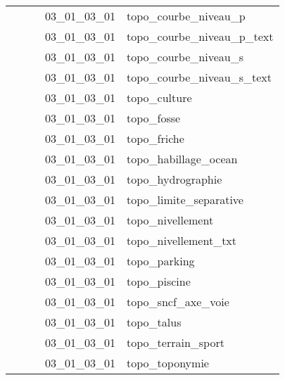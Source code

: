 \documentclass[12pt,titlepage,oneside]{book}
\begin{document}
\begin{supertabular}{|p{7.5cm}|p{7.5cm}|p{7.5cm}|c|p{10cm}|}
                   &                    &                    & 03\_01\_03\_01 & topo\_courbe\_niveau\_p\\
                   &                    &                    & 03\_01\_03\_01 & topo\_courbe\_niveau\_p\_text\\
                   &                    &                    & 03\_01\_03\_01 & topo\_courbe\_niveau\_s\\
                   &                    &                    & 03\_01\_03\_01 & topo\_courbe\_niveau\_s\_text\\
                   &                    &                    & 03\_01\_03\_01 & topo\_culture\\
                   &                    &                    & 03\_01\_03\_01 & topo\_fosse\\
                   &                    &                    & 03\_01\_03\_01 & topo\_friche\\
                   &                    &                    & 03\_01\_03\_01 & topo\_habillage\_ocean\\
                   &                    &                    & 03\_01\_03\_01 & topo\_hydrographie\\
                   &                    &                    & 03\_01\_03\_01 & topo\_limite\_separative\\
                   &                    &                    & 03\_01\_03\_01 & topo\_nivellement\\
                   &                    &                    & 03\_01\_03\_01 & topo\_nivellement\_txt\\
                   &                    &                    & 03\_01\_03\_01 & topo\_parking\\
                   &                    &                    & 03\_01\_03\_01 & topo\_piscine\\
                   &                    &                    & 03\_01\_03\_01 & topo\_sncf\_axe\_voie\\
                   &                    &                    & 03\_01\_03\_01 & topo\_talus\\
                   &                    &                    & 03\_01\_03\_01 & topo\_terrain\_sport\\
                   &                    &                    & 03\_01\_03\_01 & topo\_toponymie\\

\end{supertabular}
\end{document}
